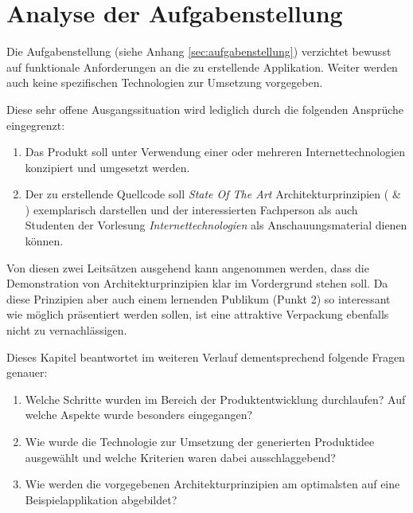 \chapter{Analyse der Aufgabenstellung}

Die Aufgabenstellung (siehe Anhang \ref{sec:aufgabenstellung}) verzichtet bewusst auf funktionale Anforderungen an die zu erstellende Applikation. Weiter werden auch keine spezifischen Technologien zur Umsetzung vorgegeben.

Diese sehr offene Ausgangssituation wird lediglich durch die folgenden Ansprüche eingegrenzt:

\begin{enumerate}
	\item Das Produkt soll unter Verwendung einer oder mehreren Internettechnologien konzipiert und umgesetzt werden.
	\item Der zu erstellende Quellcode soll \emph{State Of The Art} Architekturprinzipien (\cite{ROCA} \& \cite{TilkovSlides}) exemplarisch darstellen und der interessierten Fachperson als auch Studenten der Vorlesung \emph{Internettechnologien} als Anschauungsmaterial dienen können.
\end{enumerate}

Von diesen zwei Leitsätzen ausgehend kann angenommen werden, dass die Demonstration von Architekturprinzipien klar im Vordergrund stehen soll. Da diese Prinzipien aber auch einem lernenden Publikum (Punkt 2) so interessant wie möglich präsentiert werden sollen, ist eine attraktive Verpackung ebenfalls nicht zu vernachlässigen.

Dieses Kapitel beantwortet im weiteren Verlauf dementsprechend folgende Fragen genauer:

\begin{enumerate}
	\item Welche Schritte wurden im Bereich der Produktentwicklung durchlaufen? Auf welche Aspekte wurde besonders eingegangen?
	\item Wie wurde die Technologie zur Umsetzung der generierten Produktidee ausgewählt und welche Kriterien waren dabei ausschlaggebend?
	\item Wie werden die vorgegebenen Architekturprinzipien am optimalsten auf eine Beispielapplikation abgebildet?
\end{enumerate}

\newpage


\newpage


\newpage
